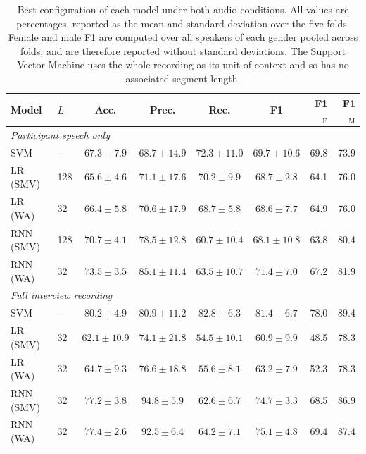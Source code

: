 \documentclass{mproj}
\begin{document}
\begin{table}[htbp]
  \centering
  \small
  \setlength{\tabcolsep}{3.5pt}
  \caption{Best configuration of each model under both audio conditions. All
  values are percentages, reported as the mean and standard deviation over the
  five folds. Female and male F1 are computed over all speakers of each gender
  pooled across folds, and are therefore reported without standard deviations.
  The Support Vector Machine uses the whole recording as its unit of context
  and so has no associated segment length.}
  \label{tab:best-configs}
  \begin{tabular}{llccccrr}
    \toprule
    Model & $L$ & Acc. & Prec. & Rec. & F1 & F1$_{\text{F}}$ & F1$_{\text{M}}$ \\
    \midrule
    \multicolumn{8}{l}{\textit{Participant speech only}} \\
    SVM       & --  & $67.3 \pm 7.9$ & $68.7 \pm 14.9$ & $72.3 \pm 11.0$ & $69.7 \pm 10.6$ & 69.8 & 73.9 \\
    LR (SMV)  & 128 & $65.6 \pm 4.6$ & $71.1 \pm 17.6$ & $70.2 \pm 9.9$  & $68.7 \pm 2.8$  & 64.1 & 76.0 \\
    LR (WA)   & 32  & $66.4 \pm 5.8$ & $70.6 \pm 17.9$ & $68.7 \pm 5.8$  & $68.6 \pm 7.7$  & 64.9 & 76.0 \\
    RNN (SMV) & 128 & $70.7 \pm 4.1$ & $78.5 \pm 12.8$ & $60.7 \pm 10.4$ & $68.1 \pm 10.8$ & 63.8 & 80.4 \\
    RNN (WA)  & 32  & $73.5 \pm 3.5$ & $85.1 \pm 11.4$ & $63.5 \pm 10.7$ & $71.4 \pm 7.0$  & 67.2 & 81.9 \\
    \midrule
    \multicolumn{8}{l}{\textit{Full interview recording}} \\
    SVM       & --  & $80.2 \pm 4.9$ & $80.9 \pm 11.2$ & $82.8 \pm 6.3$  & $81.4 \pm 6.7$  & 78.0 & 89.4 \\
    LR (SMV)  & 32  & $62.1 \pm 10.9$& $74.1 \pm 21.8$ & $54.5 \pm 10.1$ & $60.9 \pm 9.9$  & 48.5 & 78.3 \\
    LR (WA)   & 32  & $64.7 \pm 9.3$ & $76.6 \pm 18.8$ & $55.6 \pm 8.1$  & $63.2 \pm 7.9$  & 52.3 & 78.3 \\
    RNN (SMV) & 32  & $77.2 \pm 3.8$ & $94.8 \pm 5.9$  & $62.6 \pm 6.7$  & $74.7 \pm 3.3$  & 68.5 & 86.9 \\
    RNN (WA)  & 32  & $77.4 \pm 2.6$ & $92.5 \pm 6.4$  & $64.2 \pm 7.1$  & $75.1 \pm 4.8$  & 69.4 & 87.4 \\
    \bottomrule
  \end{tabular}
\end{table}
\end{document}
